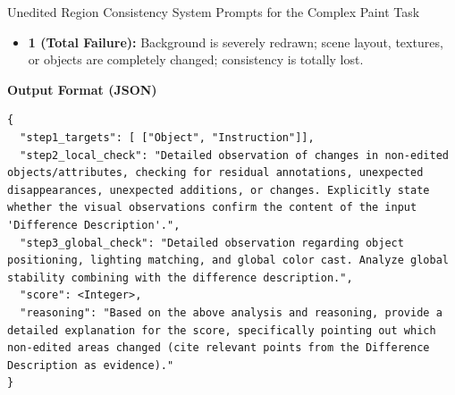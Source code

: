 \documentclass{llmxive}
\begin{document}
\begin{promptbox}[label={System Prompts: URC_Complex_paint}]{Unedited Region Consistency System Prompts for the Complex Paint Task}
\begin{itemize}[leftmargin=2.2em, labelsep=0.5em, itemsep=2pt]
    \item \textbf{1 (Total Failure):} Background is severely redrawn; scene layout, textures, or objects are completely changed; consistency is totally lost.
\end{itemize}

\medskip

\textbf{Output Format (JSON)}

\begin{lstlisting}
{
  "step1_targets": [ ["Object", "Instruction"]],
  "step2_local_check": "Detailed observation of changes in non-edited objects/attributes, checking for residual annotations, unexpected disappearances, unexpected additions, or changes. Explicitly state whether the visual observations confirm the content of the input 'Difference Description'.",
  "step3_global_check": "Detailed observation regarding object positioning, lighting matching, and global color cast. Analyze global stability combining with the difference description.",
  "score": <Integer>,
  "reasoning": "Based on the above analysis and reasoning, provide a detailed explanation for the score, specifically pointing out which non-edited areas changed (cite relevant points from the Difference Description as evidence)."
}
\end{lstlisting}

\end{promptbox}
\end{document}
